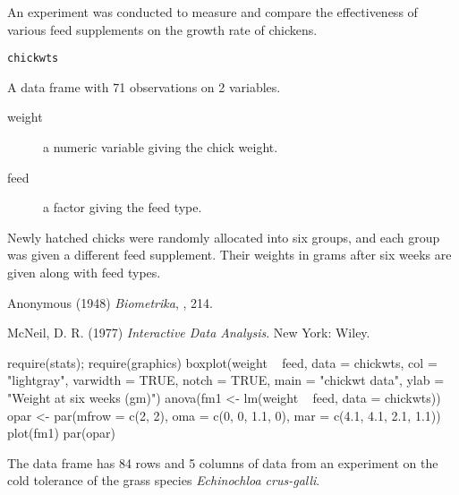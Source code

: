 %
\begin{Description}\relax
An experiment was conducted to measure and compare the effectiveness
of various feed supplements on the growth rate of chickens.
\end{Description}
%
\begin{Usage}
\begin{verbatim}
chickwts
\end{verbatim}
\end{Usage}
%
\begin{Format}
A data frame with 71 observations on 2 variables.
\begin{description}

\item[weight] a numeric variable giving the chick weight.
\item[feed] a factor giving the feed type.

\end{description}

\end{Format}
%
\begin{Details}\relax
Newly hatched chicks were randomly allocated into six groups, and each
group was given a different feed supplement.  Their weights in grams
after six weeks are given along with feed types.
\end{Details}
%
\begin{Source}\relax
Anonymous (1948)
\emph{Biometrika}, , 214.
\end{Source}
%
\begin{References}\relax
McNeil, D. R. (1977)
\emph{Interactive Data Analysis}.
New York: Wiley.
\end{References}
%
\begin{Examples}
\begin{ExampleCode}
require(stats); require(graphics)
boxplot(weight ~ feed, data = chickwts, col = "lightgray",
    varwidth = TRUE, notch = TRUE, main = "chickwt data",
    ylab = "Weight at six weeks (gm)")
anova(fm1 <- lm(weight ~ feed, data = chickwts))
opar <- par(mfrow = c(2, 2), oma = c(0, 0, 1.1, 0),
            mar = c(4.1, 4.1, 2.1, 1.1))
plot(fm1)
par(opar)
\end{ExampleCode}
\end{Examples}
%
\begin{Description}\relax
The  data frame has 84 rows and 5 columns of data from an
experiment on the cold tolerance of the grass species
\emph{Echinochloa crus-galli}.
\end{Description}
